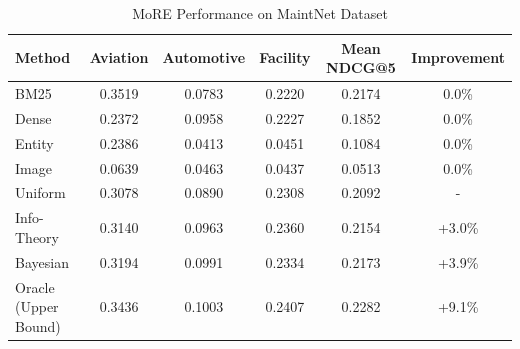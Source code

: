 \begin{table}[h]
\centering
\caption{MoRE Performance on MaintNet Dataset}
\label{tab:more_results}
\begin{tabular}{l|ccc|cc}
\hline
Method & Aviation & Automotive & Facility & Mean NDCG@5 & Improvement \\
\hline
BM25 & 0.3519 & 0.0783 & 0.2220 & 0.2174 & 0.0\% \\
Dense & 0.2372 & 0.0958 & 0.2227 & 0.1852 & 0.0\% \\
Entity & 0.2386 & 0.0413 & 0.0451 & 0.1084 & 0.0\% \\
Image & 0.0639 & 0.0463 & 0.0437 & 0.0513 & 0.0\% \\
\hline
Uniform & 0.3078 & 0.0890 & 0.2308 & 0.2092 & - \\
Info-Theory & 0.3140 & 0.0963 & 0.2360 & 0.2154 & +3.0\% \\
Bayesian & 0.3194 & 0.0991 & 0.2334 & 0.2173 & +3.9\% \\
Oracle (Upper Bound) & 0.3436 & 0.1003 & 0.2407 & 0.2282 & +9.1\% \\
\hline
\end{tabular}
\end{table}